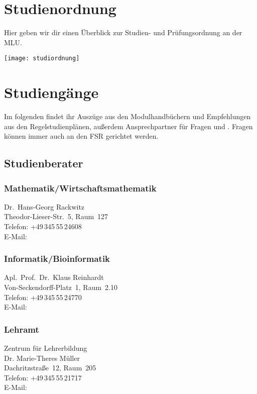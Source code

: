 
\section{Studienordnung}
Hier geben wir dir einen Überblick
zur Studien- und Prüfungsordnung an der MLU.
\begin{center}
	\texttt{[image: studiordnung]}
\end{center}

\section{Studiengänge}

Im folgenden findet ihr Auszüge aus den Modulhandbüchern und Empfehlungen aus den Regelstudienplänen, außerdem Ansprechpartner für Fragen und .
Fragen können immer auch an den FSR gerichtet werden.

\subsection{Studienberater}
\subsubsection{Mathematik/Wirtschaftsmathematik}
Dr.\ Hans-Georg Rackwitz \\
Theodor-Lieser-Str.~5, Raum~127 \\
Telefon: +49\,345\,55\,24608\\
E-Mail: \\

\subsubsection{Informatik/Bioinformatik}
Apl.\ Prof.\ Dr.\ Klaus Reinhardt \\
Von-Seckendorff-Platz~1, Raum~2.10 \\
Telefon: +49\,345\,55\,24770 \\
E-Mail: 

\subsubsection{Lehramt}
Zentrum für Lehrerbildung \\
Dr. Marie-Theres Müller \\
Dachritzstraße~12, Raum~205 \\
Telefon: +49\,345\,55\,21717 \\
E-Mail: 

